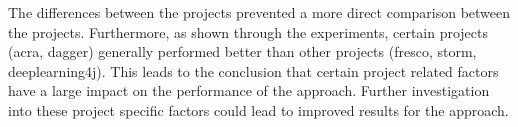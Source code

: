 The differences between the projects prevented a more direct comparison between the projects. Furthermore, as shown through the experiments, certain projects (acra, dagger) generally performed better than other projects (fresco, storm, deeplearning4j). This leads to the conclusion that certain project related factors have a large impact on the performance of the approach. Further investigation into these project specific factors could lead to improved results for the approach.